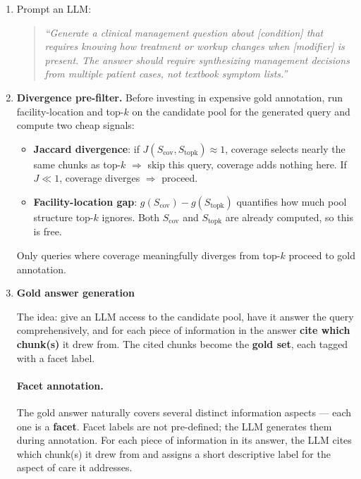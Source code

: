 \documentclass[11pt,a4paper]{article}
\newcommand{\field}[1]{\nolinkurl{#1}}
\newcommand{\icd}[1]{\texttt{#1}}
\begin{document}
\begin{enumerate}[leftmargin=*, itemsep=2mm]
\begin{itemize}[itemsep=2pt, parsep=1pt]
		      \item \textbf{Complication} (post-surgical, recurrent, hemorrhagic transformation): draws from multiple sources. Co-occurring ICD codes capture complications (e.g., stroke \icd{I63.*} + hemorrhage \icd{I61.*} on the same \field{hadm\_id}). \field{procedures\_icd} identifies post-surgical modifiers. Recurrence is detected by finding the same \field{subject\_id} with the target condition across multiple \field{hadm\_id}s.
	      \end{itemize}
	\item Prompt an LLM:
	      \begin{quote}
		      \small
		      \emph{``Generate a clinical management question about [condition] that requires knowing how treatment or workup changes when [modifier] is present.  The answer should require synthesizing management decisions from multiple patient cases, not textbook symptom lists.''}
	      \end{quote}
	\item \textbf{Divergence pre-filter.} Before investing in expensive gold annotation, run facility-location and top-$k$ on the candidate pool for the generated query and compute two cheap signals:
	      \begin{itemize}[itemsep=2pt, parsep=1pt]
		      \item \textbf{Jaccard divergence}: if $J(S_\text{cov}, S_\text{topk}) \approx 1$, coverage selects nearly the same chunks as top-$k$ $\Rightarrow$ skip this query, coverage adds nothing here.  If $J \ll 1$, coverage diverges $\Rightarrow$ proceed.
		      \item \textbf{Facility-location gap}: $g(S_\text{cov}) - g(S_\text{topk})$ quantifies how much pool structure top-$k$ ignores. Both $S_\text{cov}$ and $S_\text{topk}$ are already computed, so this is free.
	      \end{itemize}
	      Only queries where coverage meaningfully diverges from top-$k$ proceed to gold annotation.

	\item \textbf{Gold answer generation}

	      The idea: give an LLM access to the candidate pool, have it answer the query comprehensively, and for each piece of information in the answer \textbf{cite which chunk(s)} it drew from.  The cited chunks become the \textbf{gold set}, each tagged with a facet label.

	      \paragraph{Facet annotation.}
	      The gold answer naturally covers several distinct information aspects --- each one is a \textbf{facet}. Facet labels are not pre-defined; the LLM generates them during annotation. For each piece of information in its answer, the LLM cites which chunk(s) it drew from and assigns a short descriptive label for the aspect of care it addresses.


\end{enumerate}
\end{document}

